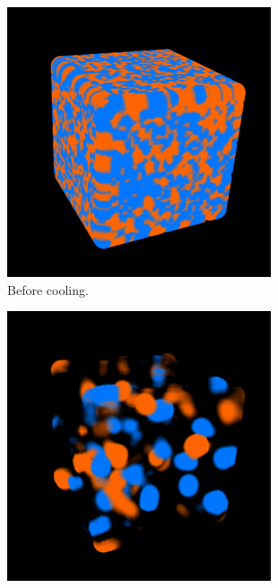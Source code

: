 \begin{figure}
\centering

\begin{subfigure}[b]{0.35\textwidth}
\includegraphics[width=\textwidth]{0cool.png}

\caption{Before cooling.}
\end{subfigure}
\qquad\qquad
\begin{subfigure}[b]{0.35\textwidth}
\includegraphics[width=\textwidth]{20cool.png}


\end{subfigure}
\end{figure}

